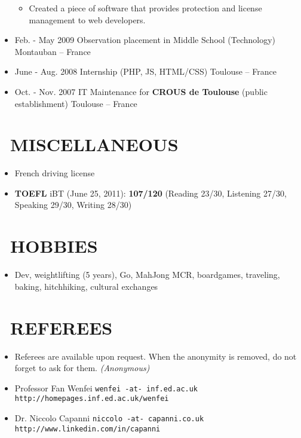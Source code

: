 \documentclass{res}
\begin{document}
\begin{resume}
\begin{itemize}
\begin{itemize}
                        \item[] Created a piece of software that provides protection and license management to web developers.
                \end{itemize}
                \item[] Feb. - May 2009 \tabto{5cm} Observation placement in Middle School (Technology) \hfill Montauban -- France
                \item[] June - Aug. 2008 \tabto{5cm} Internship (PHP, JS, HTML/CSS) \hfill Toulouse -- France
                \item[] Oct. - Nov. 2007 \tabto{5cm} IT Maintenance for \textbf{CROUS de Toulouse} (public establishment) \hfill Toulouse -- France
        \end{itemize}
        
\section{\faMagic~MISCELLANEOUS}
        \begin{itemize}
                \item[] French driving license
                \item[] \textbf{TOEFL} iBT (June 25, 2011): \textbf{107/120} (Reading 23/30, Listening 27/30, Speaking 29/30, Writing 28/30)
                    \end{itemize} 
 
\section{\faGamepad~HOBBIES}
        \begin{itemize}
                \item[] Dev, weightlifting (5 years), Go, MahJong MCR, boardgames, traveling, baking, hitchhiking, cultural exchanges
        \end{itemize}

\section{\faUserCheck~REFEREES}
\ifisanon 
     \begin{itemize}
         \item[] Referees are available upon request. When the anonymity is removed, do not forget to ask for them. \textit{(Anonymous)}
     \end{itemize}
\else
                \begin{itemize}
                        \item[] Professor Fan Wenfei \tabto{5cm} \texttt{wenfei -at- inf.ed.ac.uk} \hfill \texttt{http://homepages.inf.ed.ac.uk/wenfei}
                        \item[] Dr. Niccolo Capanni \tabto{5cm} \texttt{niccolo -at- capanni.co.uk} \hfill \texttt{http://www.linkedin.com/in/capanni}
                \end{itemize}
\fi
\end{resume} 
\end{document}
